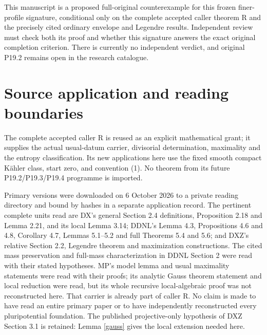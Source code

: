 \documentclass[11pt]{article}
\begin{document}
This manuscript is a proposed full-original counterexample for this
frozen finer-profile signature, conditional only on the complete
accepted caller theorem R and the precisely cited ordinary envelope
and Legendre results. Independent review must check both its proof
and whether this signature answers the exact original completion
criterion. There is currently no independent verdict, and original
P19.2 remains open in the research catalogue.

\appendix
\section{Source application and reading boundaries}
The complete accepted caller R is reused as an explicit mathematical
grant; it supplies the actual usual-datum carrier, divisorial
determination, maximality and the entropy classification. Its new
applications here use the fixed smooth compact K\"ahler class,
start zero, and convention (1). No theorem from its future
P19.2/P19.3/P19.4 programme is imported.

Primary versions were downloaded on 6 October 2026 to a private
reading directory and bound by hashes in a separate application
record. The pertinent complete units read are DX's general
Section 2.4 definitions, Proposition 2.18 and Lemma 2.21, and
its local Lemma 3.14; DDNL's Lemma 4.3, Propositions 4.6 and 4.8,
Corollary 4.7, Lemmas 5.1--5.2 and full Theorems 5.4 and 5.6;
and DXZ's relative
Section 2.2, Legendre theorem and maximization constructions.
The cited mass preservation and full-mass characterization in
DDNL Section 2 were read with their stated hypotheses. MP's
model lemma and usual maximality statements were read with their
proofs; its analytic Gauss theorem statement and local reduction
were read, but its whole recursive local-algebraic proof was not
reconstructed here. That carrier is already part of caller R.
No claim is made to have read an entire primary paper or to have
independently reconstructed every pluripotential foundation.
The published projective-only hypothesis of DXZ Section 3.1 is
retained: Lemma \ref{gauss} gives the local extension needed here.
\end{document}

